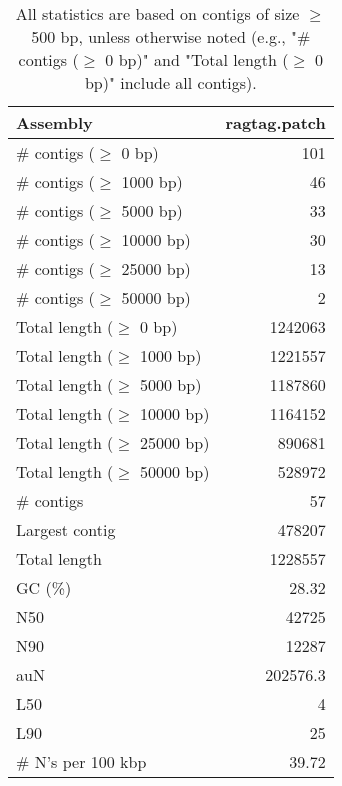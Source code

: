 \documentclass[12pt,a4paper]{article}
\begin{document}
\begin{table}[ht]
\begin{center}
\caption{All statistics are based on contigs of size $\geq$ 500 bp, unless otherwise noted (e.g., "\# contigs ($\geq$ 0 bp)" and "Total length ($\geq$ 0 bp)" include all contigs).}
\begin{tabular}{|l*{1}{|r}|}
\hline
Assembly & ragtag.patch \\ \hline
\# contigs ($\geq$ 0 bp) & 101 \\ \hline
\# contigs ($\geq$ 1000 bp) & 46 \\ \hline
\# contigs ($\geq$ 5000 bp) & 33 \\ \hline
\# contigs ($\geq$ 10000 bp) & 30 \\ \hline
\# contigs ($\geq$ 25000 bp) & 13 \\ \hline
\# contigs ($\geq$ 50000 bp) & 2 \\ \hline
Total length ($\geq$ 0 bp) & 1242063 \\ \hline
Total length ($\geq$ 1000 bp) & 1221557 \\ \hline
Total length ($\geq$ 5000 bp) & 1187860 \\ \hline
Total length ($\geq$ 10000 bp) & 1164152 \\ \hline
Total length ($\geq$ 25000 bp) & 890681 \\ \hline
Total length ($\geq$ 50000 bp) & 528972 \\ \hline
\# contigs & 57 \\ \hline
Largest contig & 478207 \\ \hline
Total length & 1228557 \\ \hline
GC (\%) & 28.32 \\ \hline
N50 & 42725 \\ \hline
N90 & 12287 \\ \hline
auN & 202576.3 \\ \hline
L50 & 4 \\ \hline
L90 & 25 \\ \hline
\# N's per 100 kbp & 39.72 \\ \hline
\end{tabular}
\end{center}
\end{table}
\end{document}
